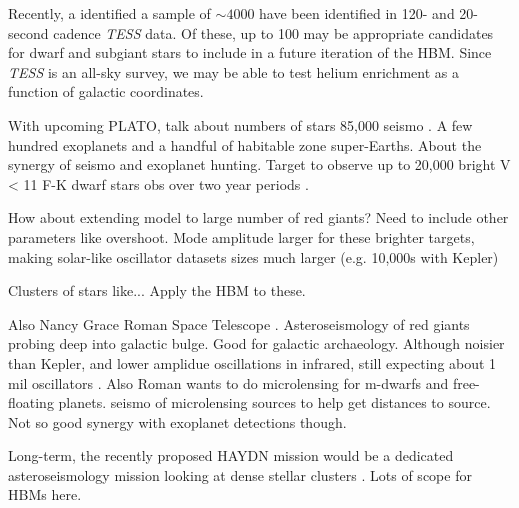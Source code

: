 Recently, a \citet{Hatt.Nielsen.ea2023} identified a sample of \(\sim 4000\) have been identified in 120- and 20-second cadence \emph{TESS} data. Of these, up to 100 may be appropriate candidates for dwarf and subgiant stars to include in a future iteration of the HBM. Since \emph{TESS} is an all-sky survey, we may be able to test helium enrichment as a function of galactic coordinates.

With upcoming PLATO, talk about numbers of stars 85,000 seismo \citep{Rauer.Catala.ea2014}. A few hundred exoplanets and a handful of habitable zone super-Earths. About the synergy of seismo and exoplanet hunting. Target to observe up to 20,000 bright V < 11 F-K dwarf stars obs over two year periods \citep{Goupil2017}. 

How about extending model to large number of red giants? Need to include other parameters like overshoot. Mode amplitude larger for these brighter targets, making solar-like oscillator datasets sizes much larger (e.g. 10,000s with Kepler)

Clusters of stars like... Apply the HBM to these.

Also Nancy Grace Roman Space Telescope \citep[formerlly WFIRST;][]{Spergel.Gehrels.ea2015}. Asteroseismology of red giants probing deep into galactic bulge. Good for galactic archaeology. Although noisier than Kepler, and lower amplidue oscillations in infrared, still expecting about 1 mil oscillators \citep{Gould.Huber.ea2015}. Also Roman wants to do microlensing for m-dwarfs and free-floating planets. seismo of microlensing sources to help get distances to source. Not so good synergy with exoplanet detections though.

Long-term, the recently proposed HAYDN mission would be a dedicated asteroseismology mission looking at dense stellar clusters \citep{Miglio.Girardi.ea2021}. Lots of scope for HBMs here.
